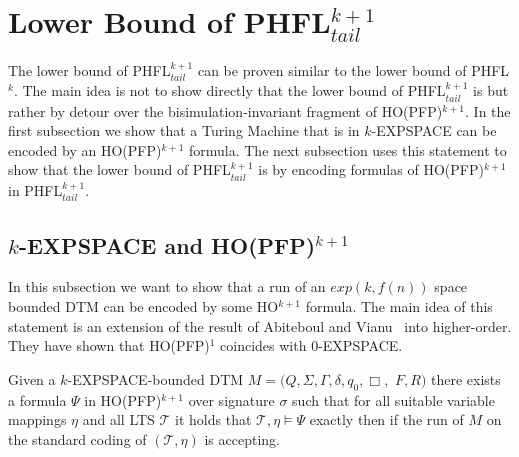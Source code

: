 
\section{Lower Bound of PHFL$^{k + 1}_{tail}$}\label{sec:lowerBoundOfPhflTail}

The lower bound of PHFL$^{k+1}_{tail}$ can be proven similar to the lower bound of PHFL$^k$. The main idea is not to
show directly that the lower bound of PHFL$^{k+1}_{tail}$ is  but rather by detour over the
bisimulation-invariant fragment of HO(PFP)$^{k+1}$. In the first subsection we show that a Turing Machine that is in
$k$-EXPSPACE can be encoded by an HO(PFP)$^{k+1}$ formula. The next subsection uses this statement to show that the
lower bound of PHFL$^{k+1}_{tail}$ is  by encoding formulas of HO(PFP)$^{k+1}$ in PHFL$^{k+1}_{tail}$.

\subsection{$k$-EXPSPACE and HO(PFP)$^{k+1}$}\label{subsec:kExpspaceInHopfp}

In this subsection we want to show that a run of an $exp(k, f(n))$ space bounded DTM can be encoded by some
HO$^{k+1}$ formula. The main idea of this statement is an extension of the result of Abiteboul and
Vianu~\cite{abiteboul1995computing} into higher-order. They have shown that HO(PFP)$^1$ coincides with $0$-EXPSPACE.


\begin{lemma}
    \label{lemma:expspace_in_ho_pfp}
    Given a $k$-EXPSPACE-bounded DTM $M = (Q, \Sigma, \Gamma, \delta, q_0, \Box,$ $ F, R)$ there exists a formula $\Psi$ in HO(PFP)$^{k+1}$ over signature $\sigma$ such that for all suitable variable mappings $\eta$ and all LTS $\mathcal{T}$ it holds that $\mathcal{T}, \eta \models \Psi$ exactly then if the run of $M$ on the standard coding of $(\mathcal{T}, \eta)$ is accepting.
\end{lemma}

